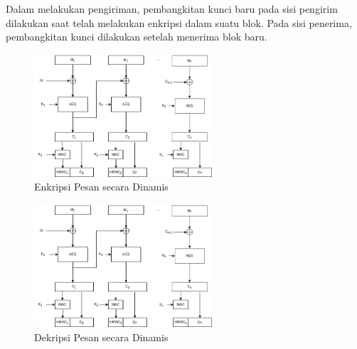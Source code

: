 Dalam melakukan pengiriman, pembangkitan kunci baru pada sisi pengirim dilakukan saat telah melakukan enkripsi dalam suatu blok. Pada sisi penerima, pembangkitan kunci dilakukan setelah menerima blok baru. 

\begin{figure}[!h]
  \centering
  \includegraphics[width=250px]{chapters/res/chapter-3/img/encrypt.png}
  \caption{Enkripsi Pesan secara Dinamis} \label{fig:solution.encrypt}
\end{figure}

\begin{figure}[!h]
  \centering
  \includegraphics[width=250px]{chapters/res/chapter-3/img/encrypt.png}
  \caption{Dekripsi Pesan secara Dinamis} \label{fig:solution.decrypt}
\end{figure}
